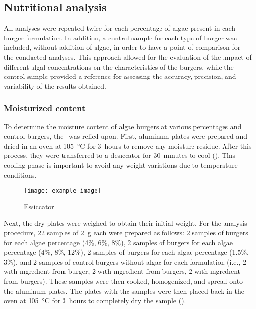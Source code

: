 \subsection{Nutritional analysis}
All analyses were repeated twice for each percentage of algae present in each burger formulation. In addition, a control sample for each type of burger was included, without addition of algae, in order to have a point of comparison for the conducted analyses. This approach allowed for the evaluation of the impact of different algal concentrations on the characteristics of the burgers, while the control sample provided a reference for assessing the accuracy, precision, and variability of the results obtained.


\subsubsection{Moisturized content}
To determine the moisture content of algae burgers at various percentages and control burgers, the~\cite{aoac_2000}  was relied upon. First, aluminum plates were prepared and dried in an oven at \qty{105}{\degreeCelsius} for \qty{3}{hours} to remove any moisture residue. After this process, they were transferred to a desiccator for \qty{30}{minutes} to cool (). This cooling phase is important to avoid any weight variations due to temperature conditions.

\begin{figure}[H]
	\centering
	\texttt{[image: example-image]}
	\caption[]{Essiccator}
	\label{fig:}
\end{figure}

Next, the dry plates were weighed to obtain their initial weight. For the analysis procedure, 22 samples of \qty{2}{\gram} each were prepared as follows: 2 samples of  burgers for each algae percentage (4\%, 6\%, 8\%), 2 samples of  burgers for each algae percentage (4\%, 8\%, 12\%), 2 samples of  burgers for each algae percentage (1.5\%, 3\%), and 2 samples of control burgers without algae for each formulation (i.e., 2 with ingredient from  burger, 2 with ingredient from  burgers, 2 with ingredient from  burgers). These samples were then cooked, homogenized, and spread onto the aluminum plates. The plates with the samples were then placed back in the oven at \qty{105}{\degreeCelsius} for \qty{3}{hours} to completely dry the sample ().

